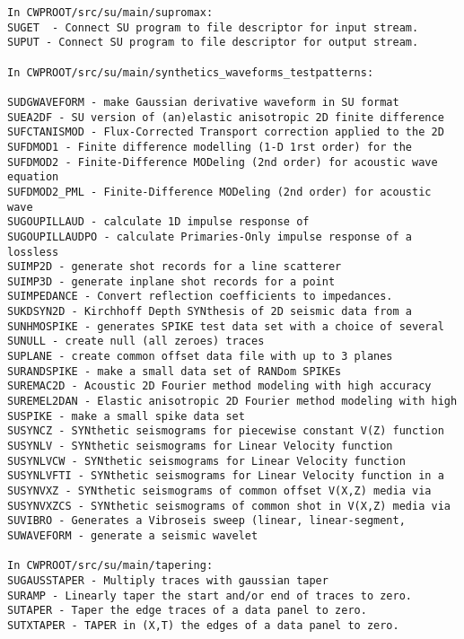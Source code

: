 {{\begin{verbatim}
In CWPROOT/src/su/main/supromax:
SUGET  - Connect SU program to file descriptor for input stream.	
SUPUT - Connect SU program to file descriptor for output stream.	

In CWPROOT/src/su/main/synthetics_waveforms_testpatterns:

SUDGWAVEFORM - make Gaussian derivative waveform in SU format		
SUEA2DF - SU version of (an)elastic anisotropic 2D finite difference 	
SUFCTANISMOD - Flux-Corrected Transport correction applied to the 2D
SUFDMOD1 - Finite difference modelling (1-D 1rst order) for the	
SUFDMOD2 - Finite-Difference MODeling (2nd order) for acoustic wave equation
SUFDMOD2_PML - Finite-Difference MODeling (2nd order) for acoustic wave
SUGOUPILLAUD - calculate 1D impulse response of	 		
SUGOUPILLAUDPO - calculate Primaries-Only impulse response of a lossless
SUIMP2D - generate shot records for a line scatterer	
SUIMP3D - generate inplane shot records for a point 	
SUIMPEDANCE - Convert reflection coefficients to impedances.  
SUKDSYN2D - Kirchhoff Depth SYNthesis of 2D seismic data from a	
SUNHMOSPIKE - generates SPIKE test data set with a choice of several   
SUNULL - create null (all zeroes) traces	 		
SUPLANE - create common offset data file with up to 3 planes	
SURANDSPIKE - make a small data set of RANDom SPIKEs 		
SUREMAC2D - Acoustic 2D Fourier method modeling with high accuracy     
SUREMEL2DAN - Elastic anisotropic 2D Fourier method modeling with high 
SUSPIKE - make a small spike data set 			
SUSYNCZ - SYNthetic seismograms for piecewise constant V(Z) function	
SUSYNLV - SYNthetic seismograms for Linear Velocity function		
SUSYNLVCW - SYNthetic seismograms for Linear Velocity function	
SUSYNLVFTI - SYNthetic seismograms for Linear Velocity function in a  
SUSYNVXZ - SYNthetic seismograms of common offset V(X,Z) media via	
SUSYNVXZCS - SYNthetic seismograms of common shot in V(X,Z) media via	
SUVIBRO - Generates a Vibroseis sweep (linear, linear-segment,
SUWAVEFORM - generate a seismic wavelet				

In CWPROOT/src/su/main/tapering:
SUGAUSSTAPER - Multiply traces with gaussian taper		
SURAMP - Linearly taper the start and/or end of traces to zero.	
SUTAPER - Taper the edge traces of a data panel to zero.	
SUTXTAPER - TAPER in (X,T) the edges of a data panel to zero.	


\end{verbatim}}}
